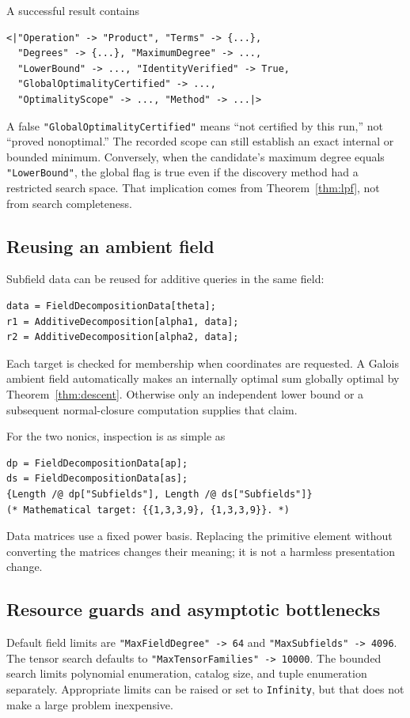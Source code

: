 \documentclass[11pt,letterpaper]{article}
\theoremstyle{definition}
\theoremstyle{remark}
\newcommand{\wl}[1]{\texttt{#1}}
\begin{document}
A successful result contains
\begin{lstlisting}
<|"Operation" -> "Product", "Terms" -> {...},
  "Degrees" -> {...}, "MaximumDegree" -> ...,
  "LowerBound" -> ..., "IdentityVerified" -> True,
  "GlobalOptimalityCertified" -> ...,
  "OptimalityScope" -> ..., "Method" -> ...|>
\end{lstlisting}
A false \wl{"GlobalOptimalityCertified"} means ``not certified by this
run,'' not ``proved nonoptimal.'' The recorded scope can still establish
an exact internal or bounded minimum. Conversely, when the candidate's
maximum degree equals \wl{"LowerBound"}, the global flag is true even
if the discovery method had a restricted search space. That implication
comes from Theorem~\ref{thm:lpf}, not from search completeness.

\subsection{Reusing an ambient field}
Subfield data can be reused for additive queries in the same field:
\begin{lstlisting}
data = FieldDecompositionData[theta];
r1 = AdditiveDecomposition[alpha1, data];
r2 = AdditiveDecomposition[alpha2, data];
\end{lstlisting}
Each target is checked for membership when coordinates are requested.
A Galois ambient field automatically makes an internally optimal sum
 globally optimal by Theorem~\ref{thm:descent}. Otherwise only an independent
lower bound or a subsequent normal-closure computation supplies that claim.

For the two nonics, inspection is as simple as
\begin{lstlisting}
dp = FieldDecompositionData[ap];
ds = FieldDecompositionData[as];
{Length /@ dp["Subfields"], Length /@ ds["Subfields"]}
(* Mathematical target: {{1,3,3,9}, {1,3,3,9}}. *)
\end{lstlisting}
Data matrices use a fixed power basis. Replacing the primitive element
without converting the matrices changes their meaning; it is not a harmless
presentation change.

\subsection{Resource guards and asymptotic bottlenecks}
Default field limits are \wl{"MaxFieldDegree" -> 64} and
\wl{"MaxSubfields" -> 4096}. The tensor search defaults to
\wl{"MaxTensorFamilies" -> 10000}. The bounded search limits polynomial
enumeration, catalog size, and tuple enumeration separately. Appropriate
limits can be raised or set to \wl{Infinity}, but that does not make a
large problem inexpensive.
\end{document}
